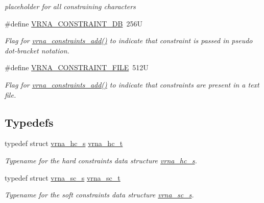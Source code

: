 \begin{DoxyCompactItemize}
\begin{DoxyCompactList}\small\item\em placeholder for all constraining characters \end{DoxyCompactList}\item 
\#define \hyperlink{group__constraints_ga4bfc2f15c4f261c62a11af9d2aa80c90}{V\-R\-N\-A\-\_\-\-C\-O\-N\-S\-T\-R\-A\-I\-N\-T\-\_\-\-D\-B}~256\-U
\begin{DoxyCompactList}\small\item\em Flag for \hyperlink{group__constraints_ga35a401f680969a556858a8dd5f1d07cc}{vrna\-\_\-constraints\-\_\-add()} to indicate that constraint is passed in pseudo dot-\/bracket notation. \end{DoxyCompactList}\item 
\#define \hyperlink{group__constraints_ga62e0ed0c33002c09423de4e646f85a2b}{V\-R\-N\-A\-\_\-\-C\-O\-N\-S\-T\-R\-A\-I\-N\-T\-\_\-\-F\-I\-L\-E}~512\-U
\begin{DoxyCompactList}\small\item\em Flag for \hyperlink{group__constraints_ga35a401f680969a556858a8dd5f1d07cc}{vrna\-\_\-constraints\-\_\-add()} to indicate that constraints are present in a text file. \end{DoxyCompactList}\end{DoxyCompactItemize}
\subsection*{Typedefs}
\begin{DoxyCompactItemize}
\item 
\hypertarget{group__constraints_gac7e4c4f8abe3163a68110c5bff24e01d}{typedef struct \hyperlink{group__hard__constraints_structvrna__hc__s}{vrna\-\_\-hc\-\_\-s} \hyperlink{group__constraints_gac7e4c4f8abe3163a68110c5bff24e01d}{vrna\-\_\-hc\-\_\-t}}\label{group__constraints_gac7e4c4f8abe3163a68110c5bff24e01d}

\begin{DoxyCompactList}\small\item\em Typename for the hard constraints data structure \hyperlink{group__hard__constraints_structvrna__hc__s}{vrna\-\_\-hc\-\_\-s}. \end{DoxyCompactList}\item 
\hypertarget{group__constraints_ga75401ce219ef8dbcceb672db82d434c6}{typedef struct \hyperlink{group__soft__constraints_structvrna__sc__s}{vrna\-\_\-sc\-\_\-s} \hyperlink{group__constraints_ga75401ce219ef8dbcceb672db82d434c6}{vrna\-\_\-sc\-\_\-t}}\label{group__constraints_ga75401ce219ef8dbcceb672db82d434c6}

\begin{DoxyCompactList}\small\item\em Typename for the soft constraints data structure \hyperlink{group__soft__constraints_structvrna__sc__s}{vrna\-\_\-sc\-\_\-s}. \end{DoxyCompactList}\end{DoxyCompactItemize}
